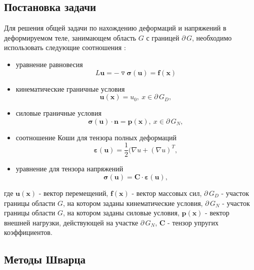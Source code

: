 \documentclass[a4paper, 14pt]{extarticle}
\begin{document}
\subsection{Постановка задачи}

Для решения общей задачи по нахождению деформаций и напряжений в деформируемом теле, занимающем область $G$ с границей $\partial \, G$, необходимо использовать следующие соотношения \cite{4}:

\begin{itemize}

\item уравнение равновесия
\begin{equation}
L \mathbf{u} = - \triangledown \bm{\sigma(u)} = \mathbf{f(x)}
\end{equation}

\item кинематические граничные условия
\begin{equation}
\bm{u(x)} = u_0, \ x \in \partial \, G_D,
\end{equation}

\item силовые граничные условия
\begin{equation}
\bm{\sigma}\mathbf{(u) \cdot n} = \mathbf{p(x)}, \ x \in \partial \, G_N,
\end{equation}

\item соотношение Коши для тензора полных деформаций
\begin{equation}
\bm{\varepsilon(u)}=\dfrac{1}{2}(\nabla u + (\nabla u)^T,
\end{equation}

\item уравнение для тензора напряжений
\begin{equation}
\bm{\sigma(u)} = \mathbf{C \cdot} \bm{\varepsilon}\mathbf{(u)},
\end{equation}
\end{itemize}

где $\mathbf{u(x)}$ - вектор перемещений, $\mathbf{f(x)}$ - вектор массовых сил, $\partial \, G_D$ - участок границы области $G$, на котором заданы кинематические условия, $\partial \, G_N$ - участок границы области $G$, на котором заданы силовые условия, $\mathbf{p(x)}$ - вектор внешней нагрузки, действующей на участке $\partial \, G_N$, $\mathbf{C}$ - тензор упругих коэффициентов. 

\newpage

\subsection{Методы Шварца}
\end{document}
